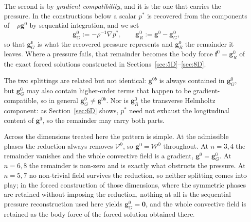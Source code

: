 \documentclass[11pt]{jfm}
\numberwithin{equation}{section}
\begin{document}
The second is by \emph{gradient compatibility}, and it is the one that carries the pressure. In
the constructions below a scalar $p^{*}$ is recovered from the components of
$-\rho\boldsymbol{g}^0$ by sequential integration, and we set
\begin{equation}
\label{eq:gGR}
\boldsymbol{g}^{0}_{G} := -\rho^{-1}\nabla p^{*},
\qquad
\boldsymbol{g}^{0}_{R} := \boldsymbol{g}^0-\boldsymbol{g}^{0}_{G},
\end{equation}
so that $\boldsymbol{g}^{0}_{G}$ is what the recovered pressure represents and
$\boldsymbol{g}^{0}_{R}$ the remainder it leaves. Where a pressure fails, that remainder becomes
the body force $\boldsymbol{f}^0=\boldsymbol{g}^{0}_{R}$ of the exact forced solutions constructed
in Sections~\ref{sec:5D}--\ref{sec:8D}.

The two splittings are related but not identical: $\boldsymbol{g}^{0b}$ is always contained in
$\boldsymbol{g}^{0}_{G}$, but $\boldsymbol{g}^{0}_{G}$ may also contain higher-order terms that
happen to be gradient-compatible, so in general
$\boldsymbol{g}^{0}_{G}\neq\boldsymbol{g}^{0b}$. Nor is $\boldsymbol{g}^{0}_{R}$ the transverse
Helmholtz component: as Section~\ref{sec:6D} shows, $p^{*}$ need not exhaust the longitudinal
content of $\boldsymbol{g}^0$, so the remainder may carry both parts.

Across the dimensions treated here the pattern is simple. At the admissible phases the reduction
always removes $\mathcal{V}^0$, so $\boldsymbol{g}^0=\mathcal{W}^0$ throughout. At $n=3,4$ the
remainder vanishes and the whole convective field is a gradient,
$\boldsymbol{g}^0=\boldsymbol{g}^{0}_{G}$. At $n=6,8$ the remainder is non-zero and is exactly what
obstructs the pressure. At $n=5,7$ no non-trivial field survives the reduction, so neither
splitting comes into play; in the forced construction of those dimensions, where the symmetric
phases are retained without imposing the reduction, nothing at all is
the sequential pressure reconstruction used here yields
$\boldsymbol{g}^{0}_{G}=\boldsymbol{0}$, and the whole convective field is retained as the body
force of the forced solution obtained there.
\end{document}
